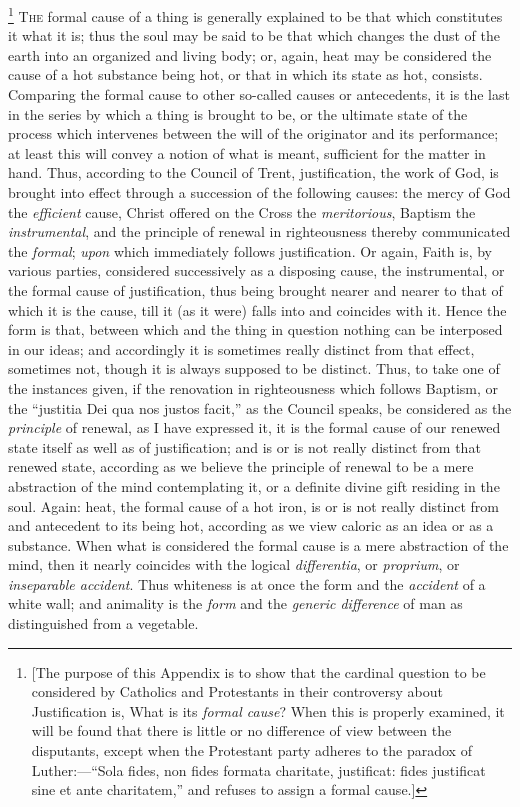 \footnote{[The purpose of this Appendix is to show that the cardinal
question to be considered by Catholics and Protestants in their
controversy about Justification is, What is its \emph{formal cause}?
When this is properly examined, it will be found that there is little
or no difference of view between the disputants, except when the
Protestant party adheres to the paradox of Luther:—``Sola fides,
non fides formata charitate, justificat: fides justificat sine et ante
charitatem,'' and refuses to assign a formal cause.]} T\textsc{he} formal cause
of a thing is generally explained to be that which constitutes it what
it is; thus the soul may be said to be that which changes the dust of
the earth into an organized and living body; or, again, heat may be
considered the cause of a hot substance being hot, or that in which
its state as hot, consists. Comparing the formal cause to other
so-called causes or antecedents, it is the last in the series by which
a thing is brought to be, or the ultimate state of the process which
intervenes between the will of the originator and its performance; at
least this will convey a notion of what is meant, sufficient for the
matter in hand. Thus, according to the Council of Trent,
justification, the work of God, is brought into effect through a
succession of the following causes: the mercy of God the \emph{efficient}
cause, Christ offered on the Cross the \emph{meritorious}, Baptism the
\emph{instrumental}, and the principle of renewal in righteousness
thereby communicated the \emph{formal}; \emph{upon} which immediately
follows justification. Or again, Faith is, by various parties,
considered successively as a disposing cause, the instrumental,
or the formal cause of justification, thus being brought nearer and
nearer to that of which it is the cause, till it (as it were) falls
into and coincides with it. Hence the form is that, between which and
the thing in question nothing can be interposed in our ideas; and
accordingly it is sometimes really distinct from that effect,
sometimes not, though it is always supposed to be distinct. Thus, to
take one of the instances given, if the renovation in righteousness
which follows Baptism, or the ``justitia Dei qua nos justos facit,''
as the Council speaks, be considered as the \emph{principle} of
renewal, as I have expressed it, it is the formal cause of our renewed
state itself as well as of justification; and is or is not really
distinct from that renewed state, according as we believe the
principle of renewal to be a mere abstraction of the mind
contemplating it, or a definite divine gift residing in the soul.
Again: heat, the formal cause of a hot iron, is or is not really
distinct from and antecedent to its being hot, according as we view
caloric as an idea or as a substance. When what is considered the
formal cause is a mere abstraction of the mind, then it nearly
coincides with the logical \emph{differentia}, or \emph{proprium}, or \emph{inseparable
accident}. Thus whiteness is at once the form and the \emph{accident}
of a white wall; and animality is the \emph{form} and the \emph{generic
difference} of man as distinguished from a vegetable.

